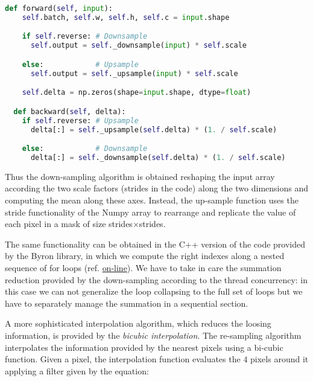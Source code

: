 \documentclass{standalone}
\begin{document}
\begin{lstlisting}[language=Python, caption=NumPyNet version of Upsampling function, label=code:py_upsample]
  def forward(self, input):
    self.batch, self.w, self.h, self.c = input.shape

    if self.reverse: # Downsample
      self.output = self._downsample(input) * self.scale

    else:            # Upsample
      self.output = self._upsample(input) * self.scale

    self.delta = np.zeros(shape=input.shape, dtype=float)

  def backward(self, delta):
    if self.reverse: # Upsample
      delta[:] = self._upsample(self.delta) * (1. / self.scale)

    else:            # Downsample
      delta[:] = self._downsample(self.delta) * (1. / self.scale)


\end{lstlisting}

Thus the down-sampling algorithm is obtained reshaping the input array according the two scale factors (\textsf{strides} in the code) along the two dimensions and computing the mean along these axes.
Instead, the up-sample function uses the stride functionality of the \textsf{Numpy} array to rearrange and replicate the value of each pixel in a mask of size \textsf{strides}$\times$\textsf{strides}.

The same functionality can be obtained in the \textsf{C++} version of the code provided by the \textsf{Byron} library, in which we compute the right indexes along a nested sequence of for loops (ref. \href{https://github.com/Nico-Curti/Byron/blob/master/src/upsample_layer.cpp}{on-line}).
We have to take in care the summation reduction provided by the down-sampling according to the thread concurrency: in this case we can not generalize the loop collapsing to the full set of loops but we have to separately manage the summation in a sequential section.

A more sophisticated interpolation algorithm, which reduces the loosing information, is provided by the \emph{bicubic interpolation}.
The re-sampling algorithm interpolates the information provided by the nearest pixels using a bi-cubic function.
Given a pixel, the interpolation function evaluates the $4$ pixels around it applying a filter given by the equation:
\end{document}

